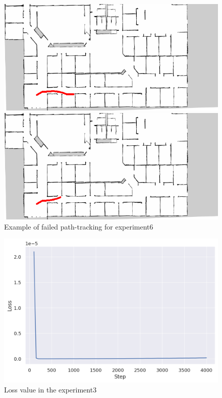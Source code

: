 \begin{figure}[h]
  \begin{minipage}[b]{0.45\linewidth}
    \centering
    \includegraphics[keepaspectratio, scale=0.33]{images/9cam/traject19.png}
    \subcaption{}
  \end{minipage}
  \begin{minipage}[b]{0.45\linewidth}
    \centering
    \includegraphics[keepaspectratio, scale=0.33]{images/9cam/traject26.png}
    \subcaption{}
  \end{minipage}
\caption{Example of failed path-tracking for experiment6}
\label{Fig:fail6}
\end{figure}

\begin{figure}[h]
  \centering
  \includegraphics[keepaspectratio, scale=0.4]{images/exp3_25.png}
  \caption{Loss value in the experiment3}
  \label{Fig:loss3}
\end{figure}

